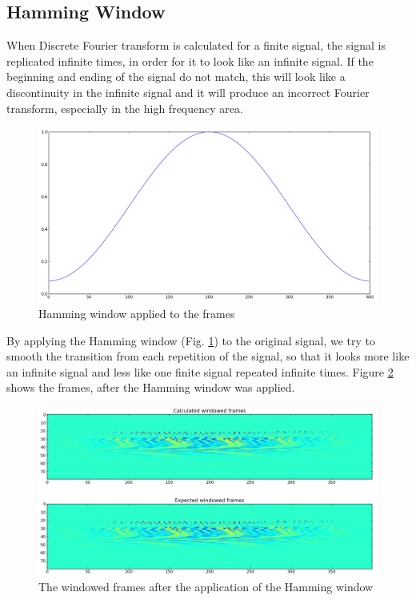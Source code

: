 \documentclass[12pt,a4paper,oneside]{article}
\begin{document}
\subsection{Hamming Window}
When Discrete Fourier transform is calculated for a finite signal, the signal is replicated infinite times, in order for it to look like an infinite signal. If the beginning and ending of the signal do not match, this will look like a discontinuity in the infinite signal and it will produce an incorrect Fourier transform, especially in the high frequency area.

\begin{figure}[h]
\centering
\includegraphics[scale=0.3]{../hamming.png}
\caption{Hamming window applied to the frames}
\label{fig:hamming}
\end{figure}

By applying the Hamming window (Fig. \ref{fig:hamming}) to the original signal, we try to smooth the transition from each repetition of the signal, so that it looks more like an infinite signal and less like one finite signal repeated infinite times. Figure \ref{fig:windowed} shows the frames, after the Hamming window was applied.

\begin{figure}[h]
\includegraphics[scale=0.4]{../windowed.png}
\caption{The windowed frames after the application of the Hamming window}
\label{fig:windowed}
\end{figure}
\end{document}
